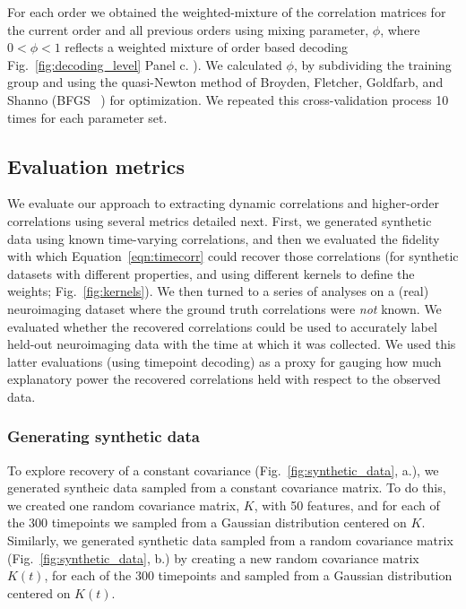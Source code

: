For each order we obtained the weighted-mixture of the correlation
matrices for the current order and all previous orders using mixing parameter, $\phi$, where $0 <\phi< 1$ reflects a
weighted mixture of order based decoding Fig.~\ref{fig:decoding_level}
Panel c. ). We calculated  $\phi$, by
subdividing the training group and using the quasi-Newton method of
Broyden, Fletcher, Goldfarb, and Shanno (BFGS ~\citep{NoceWrig06}) for optimization. We
repeated this cross-validation process 10 times for each parameter set. 














\subsection*{Evaluation metrics}
We evaluate our approach to extracting dynamic correlations and
higher-order correlations using several metrics detailed next.  First,
we generated synthetic data using known time-varying correlations, and
then we evaluated the fidelity with which Equation~\ref{eqn:timecorr}
could recover those correlations (for synthetic datasets with
different properties, and using different kernels to define the
weights; Fig.~\ref{fig:kernels}).  We then turned to a series of
analyses on a (real) neuroimaging dataset where the ground truth
correlations were \textit{not} known.  We evaluated whether the
recovered correlations could be used to accurately label held-out
neuroimaging data with the time at which it was collected.  We used this latter evaluations (using timepoint
decoding) as a proxy for
gauging how much explanatory power the recovered correlations held
with respect to the observed data.

\subsubsection*{Generating synthetic data}
To explore recovery of a constant covariance (Fig.~\ref{fig:synthetic_data},  a.), we generated syntheic
data sampled from a constant covariance matrix. To do this, we created one random
covariance matrix, $K$, with 50 features, and for each of the 300 timepoints  we
sampled from a Gaussian distribution centered on $K$.  Similarly, we generated synthetic data
sampled from a random covariance matrix (Fig.~\ref{fig:synthetic_data}, b.) by creating a new random
covariance matrix $K(t)$, for each of the 300 timepoints and sampled from a
Gaussian distribution centered on $K(t)$.

